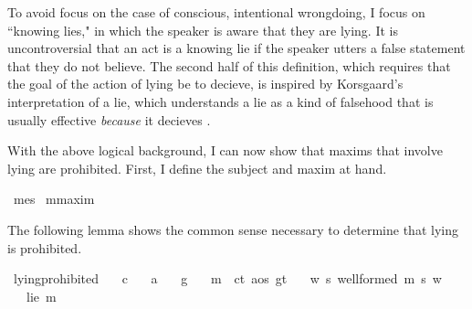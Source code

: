\begin{isabellebody}
%
%
\begin{isamarkuptext}%
To avoid focus on the case of conscious, intentional wrongdoing, I focus on ``knowing lies," 
in which the speaker is aware that they are lying. It is uncontroversial that an act is a knowing lie
if the speaker utters a false statement that they do not believe. The second half of this definition, which 
requires that the goal of the action of lying be to decieve, is inspired by  Korsgaard's interpretation 
of a lie, which understands a lie as a kind of falsehood that is usually effective \emph{because} it decieves
\citep[4]{KorsgaardRTL}.%
\end{isamarkuptext}\isamarkuptrue%
%
\begin{isamarkuptext}%
With the above logical background, I can now show that maxims that involve lying are prohibited.
First, I define the subject and maxim at hand.%
\end{isamarkuptext}\isamarkuptrue%
\isamarkupfalse%
\ me{\isacharcolon}{\isacharcolon}s\isanewline
%
\isanewline
{}\isamarkupfalse%
\ m{\isacharcolon}{\isacharcolon}maxim\isanewline
%
%
\begin{isamarkuptext}%
The following lemma shows the common sense necessary to determine that lying is prohibited.%
\end{isamarkuptext}\isamarkuptrue%
\isamarkupfalse%
\ lying{\isacharunderscore}prohibited{\isacharcolon}\isanewline
\ \ \ c\isanewline
\ \ \ a\isanewline
\ \ \ g\isanewline
\ \ \ {\isachardoublequoteopen}m\ {\isasymequiv}\ {\isacharparenleft}c{\isacharcolon}{\isacharcolon}t{\isacharcomma}\ a{\isacharcolon}{\isacharcolon}os{\isacharcomma}\ g{\isacharcolon}{\isacharcolon}t{\isacharparenright}{\isachardoublequoteclose}\isanewline
\ \ \ {\isachardoublequoteopen}{\isasymforall}w{\isachardot}\ {\isasymforall}s{\isachardot}\ well{\isacharunderscore}formed\ m\ s\ w{\isachardoublequoteclose}\isanewline
%
\isanewline
\ \ \ {\isachardoublequoteopen}lie\ m{\isachardoublequoteclose}\isanewline

\end{isabellebody}
